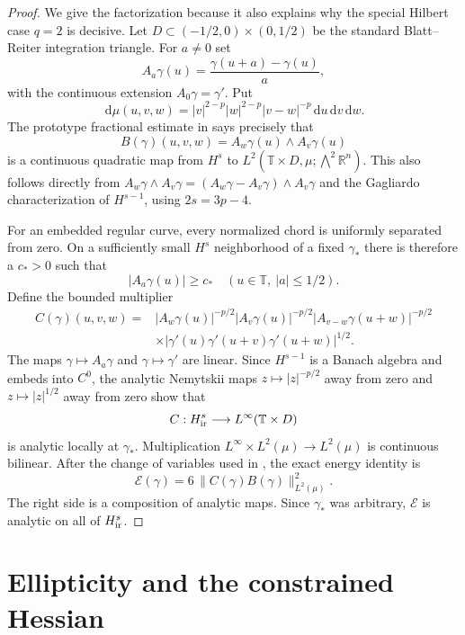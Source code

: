 \documentclass[11pt]{article}
\theoremstyle{remark}
\newcommand{\T}{\mathbb T}
\newcommand{\R}{\mathbb R}
\newcommand{\E}{\mathcal E}
\newcommand{\dd}{\,\mathrm d}
\begin{document}
\begin{proof}
We give the factorization because it also explains why the special Hilbert
case $q=2$ is decisive.  Let $D\subset(-1/2,0)\times(0,1/2)$ be the standard
Blatt--Reiter integration triangle.  For $a\ne0$ set
\[
 A_a\gamma(u)=\frac{\gamma(u+a)-\gamma(u)}a,
\]
with the continuous extension $A_0\gamma=\gamma'$.  Put
\[
 \dd\mu(u,v,w)=|v|^{2-p}|w|^{2-p}|v-w|^{-p}\dd u\dd v\dd w.
\]
The prototype fractional estimate in \cite[Lemma 4.4]{BR} says precisely that
\[
 B(\gamma)(u,v,w)=A_w\gamma(u)\wedge A_v\gamma(u)
\]
is a continuous quadratic map from $H^s$ to
$L^2(\T\times D,\mu;\bigwedge^2\R^n)$.  This also follows directly from
$A_w\gamma\wedge A_v\gamma=(A_w\gamma-A_v\gamma)\wedge A_v\gamma$
and the Gagliardo characterization of $H^{s-1}$, using
$2s=3p-4$.

For an embedded regular curve, every normalized chord is uniformly separated
from zero.  On a sufficiently small $H^s$ neighborhood of a fixed
$\gamma_*$ there is therefore a $c_*>0$ such that
\[
 |A_a\gamma(u)|\ge c_*
 \quad (u\in\T,\ |a|\le1/2).
\]
Define the bounded multiplier
\begin{align*}
 C(\gamma)(u,v,w)={}&
 |A_w\gamma(u)|^{-p/2}|A_v\gamma(u)|^{-p/2}
 |A_{v-w}\gamma(u+w)|^{-p/2}\\
 &\times |\gamma'(u)\gamma'(u+v)\gamma'(u+w)|^{1/2}.
\end{align*}
The maps $\gamma\mapsto A_a\gamma$ and $\gamma\mapsto\gamma'$ are linear.
Since $H^{s-1}$ is a Banach algebra and embeds into $C^0$, the analytic
Nemytskii maps $z\mapsto |z|^{-p/2}$ away from zero and
$z\mapsto |z|^{1/2}$ away from zero show that
\[
 C:H^s_{\rm ir}\longrightarrow L^\infty(\T\times D)
\]
is analytic locally at $\gamma_*$.  Multiplication
$L^\infty\times L^2(\mu)\to L^2(\mu)$ is continuous bilinear.  After the
change of variables used in \cite[Section 4]{BR}, the exact energy identity is
\[
 \E(\gamma)=6\,\|C(\gamma)B(\gamma)\|_{L^2(\mu)}^2.
\]
The right side is a composition of analytic maps.  Since $\gamma_*$ was
arbitrary, $\E$ is analytic on all of $H^s_{\rm ir}$.
\end{proof}

\section{Ellipticity and the constrained Hessian}
\end{document}
